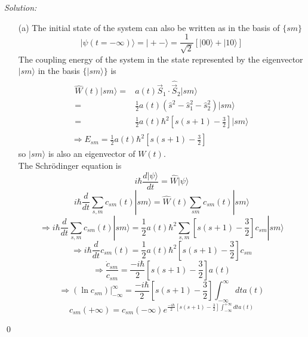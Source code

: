 \documentclass[10pt,a4paper]{article}
\newenvironment{sol}
    {\emph{Solution:}
    }
    {
    \qed
    }
\begin{document}
\begin{sol}
\begin{itemize}
\item[(a)] The initial state of the system can also be written as in the basis of $\{sm\}$
\begin{equation}
\label{2ini}
|\psi(t=-\infty)\rangle=|+-\rangle=\frac{1}{\sqrt{2}}[|00\rangle+|10\rangle]
\end{equation}
The coupling energy of the system in the state represented by the eigenvector $|sm\rangle$ in the basis $\{|sm\rangle\}$ is
\begin{gather}
\begin{align}
\nonumber\hat{W}(t)|sm\rangle=&a(t)\hat{\vec{S}}_1\cdot\hat{\vec{S}}_2|sm\rangle\\
\nonumber=&\frac{1}{2}a(t)(\hat{s}^2-\hat{s}_1^2-\hat{s}_2^2)|sm\rangle\\
=&\frac{1}{2}a(t)\hbar^2[s(s+1)-\frac{3}{2}]|sm\rangle
\end{align}\\
\Longrightarrow E_{sm}=\frac{1}{2}a(t)\hbar^2[s(s+1)-\frac{3}{2}]
\end{gather}
so $|sm\rangle$ is also an eigenvector of $W(t)$.\\
The Schrödinger equation is
\begin{equation}
i\hbar\frac{d|\psi\rangle}{dt}=\hat{W}|\psi\rangle
\end{equation}
\begin{equation}
i\hbar\frac{d}{dt}\sum_{s,m}c_{sm}(t)|sm\rangle=\hat{W}(t)\sum_{sm}c_{sm}(t)|sm\rangle
\end{equation}
\begin{equation}
\Longrightarrow i\hbar\frac{d}{dt}\sum_{s,m}c_{sm}(t)|sm\rangle=\frac{1}{2}a(t)\hbar^2\sum_{s,m}[s(s+1)-\frac{3}{2}]c_{sm}|sm\rangle
\end{equation}
\begin{equation}
\Longrightarrow i\hbar\frac{d}{dt}c_{sm}(t)=\frac{1}{2}a(t)\hbar^2[s(s+1)-\frac{3}{2}]c_{sm}
\end{equation}
\begin{equation}
\Longrightarrow \frac{\dot{c}_{sm}}{c_{sm}}=\frac{-i\hbar}{2}[s(s+1)-\frac{3}{2}]a(t)
\end{equation}
\begin{equation}
\Longrightarrow(\ln c_{sm})|_{-\infty}^{\infty}=\frac{-i\hbar}{2}[s(s+1)-\frac{3}{2}]\int_{-\infty}^{\infty}dta(t)
\end{equation}
\begin{equation}
c_{sm}(+\infty)=c_{sm}(-\infty)e^{\frac{-i\hbar}{2}[s(s+1)-\frac{3}{2}]\int_{-\infty}^{+\infty}dta(t)}

\end{equation}
\end{itemize}
\end{sol}
\end{document}
